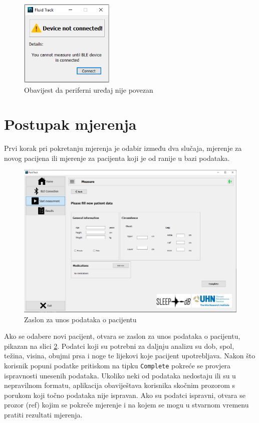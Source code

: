 \documentclass[../diplomski_rad.tex]{subfiles}
\begin{document}
\begin{figure}[htb]
    \centering
    \includegraphics[width=0.4\textwidth]{Figures/ble_not_connected.png} 
    \caption{Obavijest da periferni uređaj nije povezan}
    \label{slk:ble_not_connected}
\end{figure}

\section{Postupak mjerenja}

Prvi korak pri pokretanju mjerenja je odabir između dva slučaja, mjerenje za novog pacijena ili 
mjerenje za pacijenta koji je od ranije u bazi podataka.

\begin{figure}[htb]
    \centering
    \includegraphics[width=1\textwidth]{Figures/patient.png} 
    \caption{Zaslon za unos podataka o pacijentu}
    \label{slk:patient}
\end{figure}

Ako se odabere novi pacijent, otvara se zaslon za unos podataka o pacijentu, pikazan na slici \ref{slk:patient}. 
Podatci koji su potrebni za daljnju analizu su dob, spol, težina, visina, obujmi prsa i noge te lijekovi koje pacijent upotrebljava. 
Nakon što korisnik popuni podatke pritiskom na tipku \texttt{Complete} pokreće se provjera ispravnosti unesenih podataka. 
Ukoliko neki od podataka nedostaju ili su u nepravilnom formatu, aplikacija obaviještava korisnika skočnim prozorom s 
porukom koji točno podataka nije ispravan. Ako su podatci ispravni, otvara se prozor (ref) kojim se pokreče mjerenje i na kojem 
se mogu u stvarnom vremenu pratiti rezultati mjerenja.  
\end{document}

